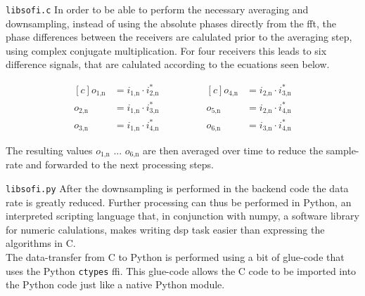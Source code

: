 \begin{subchapter}{\texttt{libsofi.c}}
  In order to be able to perform the necessary averaging
  and downsampling, instead of using the absolute phases
  directly from the \gls{fft}, the phase differences between the receivers
  are calulated prior to the averaging step, using complex conjugate multiplication.
  For four receivers this leads to six difference signals,
  that are calulated according to the ecuations seen below.

  \begin{equation*}
    \begin{aligned}[c]
      o_\text{1,n}&= i_\text{1,n} \cdot i_\text{2,n}^{\ast} \\
      o_\text{2,n}&= i_\text{1,n} \cdot i_\text{3,n}^{\ast} \\
      o_\text{3,n}&= i_\text{1,n} \cdot i_\text{4,n}^{\ast}
    \end{aligned}
    \qquad \qquad
    \begin{aligned}[c]
      o_\text{4,n}&= i_\text{2,n} \cdot i_\text{3,n}^{\ast} \\
      o_\text{5,n}&= i_\text{2,n} \cdot i_\text{4,n}^{\ast} \\
      o_\text{6,n}&= i_\text{3,n} \cdot i_\text{4,n}^{\ast}
    \end{aligned}
  \end{equation*}

  The resulting values $o_\text{1,n}$ ... $o_\text{6,n}$
  are then averaged over time to reduce the sample-rate
  and forwarded to the next processing steps.
\end{subchapter}

\begin{subchapter}{\texttt{libsofi.py}}
  After the downsampling is performed in the backend code
  the data rate is greatly reduced. Further processing
  can thus be performed in Python, an interpreted scripting
  language that, in conjunction with numpy, a software library for
  numeric calulations, makes writing \acrshort{dsp} task easier
  than expressing the algorithms in C. \\

  The data-transfer from C to Python is performed using
  a bit of glue-code that uses the Python \texttt{ctypes}
  \gls{ffi}.
  This glue-code allows the C code to be imported
  into the Python code just like a native Python module.
\end{subchapter}

